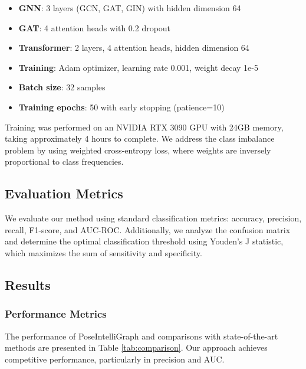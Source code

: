 \documentclass[conference]{IEEEtran}
\begin{document}
\begin{itemize}
    \item \textbf{GNN}: 3 layers (GCN, GAT, GIN) with hidden dimension 64
    \item \textbf{GAT}: 4 attention heads with 0.2 dropout
    \item \textbf{Transformer}: 2 layers, 4 attention heads, hidden dimension 64
    \item \textbf{Training}: Adam optimizer, learning rate 0.001, weight decay 1e-5
    \item \textbf{Batch size}: 32 samples
    \item \textbf{Training epochs}: 50 with early stopping (patience=10)
\end{itemize}

Training was performed on an NVIDIA RTX 3090 GPU with 24GB memory, taking approximately 4 hours to complete. We address the class imbalance problem by using weighted cross-entropy loss, where weights are inversely proportional to class frequencies.

\subsection{Evaluation Metrics}
We evaluate our method using standard classification metrics: accuracy, precision, recall, F1-score, and AUC-ROC. Additionally, we analyze the confusion matrix and determine the optimal classification threshold using Youden's J statistic, which maximizes the sum of sensitivity and specificity.

\subsection{Results}

\subsubsection{Performance Metrics}
The performance of PoseIntelliGraph and comparisons with state-of-the-art methods are presented in Table \ref{tab:comparison}. Our approach achieves competitive performance, particularly in precision and AUC.
\end{document}
